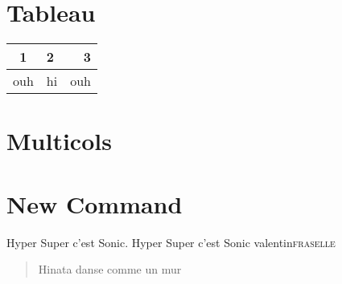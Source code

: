 \documentclass[10pt,a4paper]{scrartcl}
\begin{document}
\section{Tableau}
\begin{tabular}{|c|p{1cm}|r|}
\hline
1 & 2 & 3 \\
\hline
ouh & hi & ouh \\
\hline
\end{tabular}
\section{Multicols}
\lipsum[1]
\begin{multicols}{2}
\lipsum[2]
\end{multicols}
\section{New Command}
\newcommand{\SONIC}{Hyper Super c'est Sonic\xspace}
\SONIC .
\newcommand{\guillemets}[1]{\og #1\fg}
\guillemets{\SONIC}
\newcommand{\nompropre}[2]{#1\xspace\scshape #2\xspace}
\nompropre{valentin}{fraselle}
\newenvironment{citationFR}{\begin{quotation}\og}{\fg\end{quotation}}
\begin{citationFR}
Hinata danse comme un mur
\end{citationFR}
\end{document}

